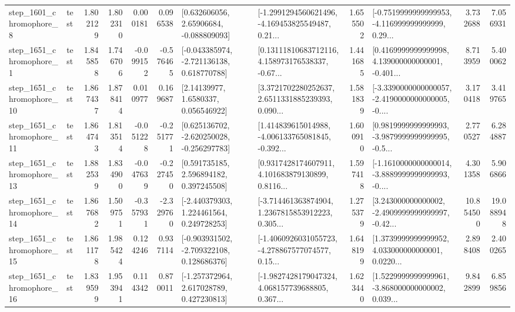 \begin{tabular}{llrrrrllrlrr}
  step\_1601\_chromophore\_8 &      test &      1.802129 &    1.802310 &      0.000181 &  0.096538 &     [0.632606056, 2.65906684, -0.088809093] &  [-1.2991294560621496, -4.169453825549487, 0.21... &       1.655502 &  [-0.7519999999999953, -4.116999999999999, 0.29... &            3.732688 &          7.056931 \\
  step\_1651\_chromophore\_1 &      test &      1.845858 &    1.746706 &     -0.099152 & -0.576465 &   [-0.043385974, -2.721136138, 0.618770788] &  [0.13111810683712116, 4.158973176538337, -0.67... &       1.441685 &  [0.4169999999999998, 4.139000000000001, -0.401... &            8.713959 &          5.400062 \\
 step\_1651\_chromophore\_10 &      test &      1.867437 &    1.878414 &      0.010977 &  0.169687 &        [2.14139977, 1.6580337, 0.056546922] &  [3.3721702280252637, 2.6511331885239393, 0.090... &       1.581839 &  [-3.3390000000000057, -2.4190000000000005, -0.... &            3.170418 &          3.419765 \\
 step\_1651\_chromophore\_11 &      test &      1.864743 &    1.813514 &     -0.051228 & -0.251771 &   [0.625136702, -2.620250028, -0.256297783] &  [1.414839615014988, -4.006133765081845, -0.392... &       1.600910 &  [0.9819999999999993, -3.9879999999999995, -0.5... &            2.770527 &          6.284887 \\
 step\_1651\_chromophore\_13 &      test &      1.882539 &    1.834900 &     -0.047639 & -0.227450 &     [0.591735185, 2.596894182, 0.397245508] &  [0.9317428174607911, 4.101683879130899, 0.8116... &       1.597418 &  [-1.1610000000000014, -3.8889999999999993, -0.... &            4.301358 &          5.906866 \\
 step\_1651\_chromophore\_14 &      test &      1.867682 &    1.509751 &     -0.357931 & -2.329760 &    [-2.440379303, 1.224461564, 0.249728253] &  [-3.714461363874904, 1.2367815853912223, 0.305... &       1.275379 &  [3.243000000000002, -2.4909999999999997, -0.42... &           10.854500 &         19.088948 \\
 step\_1651\_chromophore\_15 &      test &      1.861178 &    1.985424 &      0.124246 &  0.937114 &   [-0.903931502, -2.709322108, 0.128686376] &  [-1.4060926031055723, -4.278867577074577, 0.15... &       1.648199 &  [1.3739999999999952, 4.033000000000001, 0.0220... &            2.898408 &          2.400265 \\
 step\_1651\_chromophore\_16 &      test &      1.839599 &    1.953941 &      0.114342 &  0.870011 &    [-1.257372964, 2.617028789, 0.427230813] &  [-1.9827428179047324, 4.068157739688805, 0.367... &       1.623440 &  [1.5229999999999961, -3.868000000000002, 0.039... &            9.842899 &          6.859856 \\

\end{tabular}
